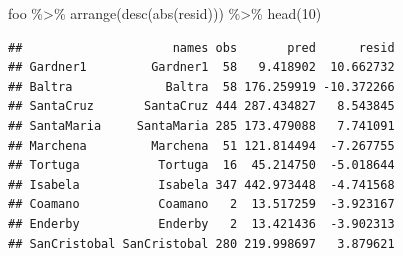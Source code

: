 \documentclass[
  ignorenonframetext,
]{beamer}
\newenvironment{Shaded}{\begin{snugshade}}{\end{snugshade}}
\newcommand{\DecValTok}[1]{\textcolor[rgb]{0.00,0.00,0.81}{#1}}
\newcommand{\FunctionTok}[1]{\textcolor[rgb]{0.00,0.00,0.00}{#1}}
\newcommand{\NormalTok}[1]{#1}
\newcommand{\SpecialCharTok}[1]{\textcolor[rgb]{0.00,0.00,0.00}{#1}}
\begin{document}
\begin{frame}[fragile]{}
\protect\hypertarget{section-24}{}
\begin{Shaded}
\begin{Highlighting}[]
\NormalTok{foo }\SpecialCharTok{\%\textgreater{}\%} \FunctionTok{arrange}\NormalTok{(}\FunctionTok{desc}\NormalTok{(}\FunctionTok{abs}\NormalTok{(resid))) }\SpecialCharTok{\%\textgreater{}\%} \FunctionTok{head}\NormalTok{(}\DecValTok{10}\NormalTok{)}
\end{Highlighting}
\end{Shaded}

\begin{verbatim}
##                     names obs       pred      resid
## Gardner1         Gardner1  58   9.418902  10.662732
## Baltra             Baltra  58 176.259919 -10.372266
## SantaCruz       SantaCruz 444 287.434827   8.543845
## SantaMaria     SantaMaria 285 173.479088   7.741091
## Marchena         Marchena  51 121.814494  -7.267755
## Tortuga           Tortuga  16  45.214750  -5.018644
## Isabela           Isabela 347 442.973448  -4.741568
## Coamano           Coamano   2  13.517259  -3.923167
## Enderby           Enderby   2  13.421436  -3.902313
## SanCristobal SanCristobal 280 219.998697   3.879621
\end{verbatim}
\end{frame}
\end{document}
